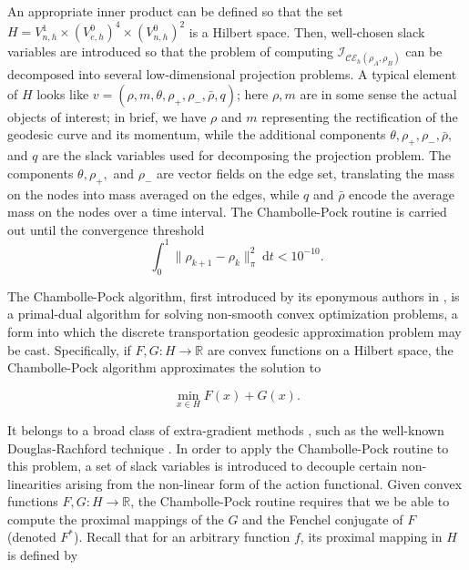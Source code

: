 \documentclass{article}
\newcommand{\R}{\mathbb{R}}
\newcommand{\I}{\mathcal{I}}
\newcommand{\diff}{\:\mathrm{d}}
\begin{document}
An appropriate inner product can be defined so that the set \(H = V_{n,h}^1 \times (V_{e,h}^0)^4 \times (V_{n,h}^0)^2\) is a Hilbert space. Then, well-chosen slack variables are introduced so that the problem of computing \(\I_{\mathcal{CE}_h(\rho_A, \rho_B)}\) can be decomposed into several low-dimensional projection problems. A typical element of \(H\) looks like \(v = (\rho, m, \theta, \rho_{+}, \rho_{-}, \bar{\rho}, q) \); here \(\rho, m\) are in some sense the actual objects of interest; in brief, we have \(\rho\) and \(m\) representing the rectification of the geodesic curve and its momentum, while the additional components \(\theta, \rho_{+}, \rho_{-}, \bar{\rho},\) and \(q\) are the slack variables used for decomposing the projection problem. The components \(\theta, \rho_{+},\) and \(\rho_{-}\) are vector fields on the edge set, translating the mass on the nodes into mass averaged on the edges, while \(q\) and \(\bar\rho\) encode the average mass on the nodes over a time interval.  The Chambolle-Pock routine is carried out until the convergence threshold
\begin{equation*}
  \int_0^1\|\rho_{k+1} - \rho_{k}\|_{\pi}^2 \diff t < 10^{-10}.
\end{equation*}

The Chambolle-Pock algorithm, first introduced by its eponymous authors in \cite{chambolleFirstOrderPrimalDualAlgorithm2011}, is a primal-dual algorithm for solving non-smooth convex optimization problems, a form into which the discrete transportation geodesic approximation problem may be cast. Specifically, if \(F, G: H \to \R\) are convex functions on a Hilbert space, the Chambolle-Pock algorithm approximates the solution to

\begin{equation*}
  \min_{x \in H} F(x) + G(x).
\end{equation*}

It belongs to a broad class of extra-gradient methods \cite{korpelevichEXTRAGRADIENTMETHODFINDING1976}, such as the well-known Douglas-Rachford technique \cite{lionsSplittingAlgorithmsSum1979, condat2023proximal}. In order to apply the Chambolle-Pock routine to this problem, a set of slack variables is introduced to decouple certain non-linearities arising from the non-linear form of the action functional. Given convex functions \(F,G: H \to \R\), the Chambolle-Pock routine requires that we be able to compute the proximal mappings of the \(G\) and the Fenchel conjugate of \(F\) (denoted \(F^*\)). Recall that for an arbitrary function \(f\), its proximal mapping in \(H\) is defined by
\end{document}
